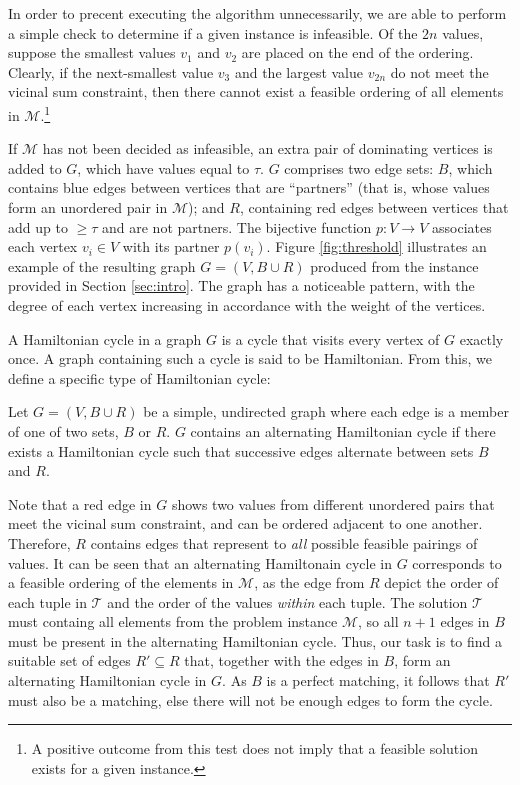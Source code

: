\documentclass{elsarticle}
\begin{document}
In order to precent executing the algorithm unnecessarily, we are able to perform a simple check to determine if a given instance is infeasible. Of the $2n$ values, suppose the smallest values $v_1$ and $v_2$ are placed on the end of the ordering. Clearly, if the next-smallest value $v_3$ and the largest value $v_{2n}$ do not meet the vicinal sum constraint, then there cannot exist a feasible ordering of all elements in $\mathcal{M}$.\footnote{A positive outcome from this test does not imply that a feasible solution exists for a given instance.}

If $\mathcal{M}$ has not been decided as infeasible, an extra pair of dominating vertices is added to $G$, which have values equal to $\tau$. $G$ comprises two edge sets: $B$, which contains blue edges between vertices that are ``partners'' (that is, whose values form an unordered pair in $\mathcal{M}$); and $R$, containing red edges between vertices that add up to $\geq \tau$ and are not partners. The bijective function $p : V \to V$ associates each vertex $v_i \in V$ with its partner $p(v_i)$. Figure \ref{fig:threshold} illustrates an example of the resulting graph $G = (V, B \cup R)$ produced from the instance provided in Section \ref{sec:intro}. The graph has a noticeable pattern, with the degree of each vertex increasing in accordance with the weight of the vertices.

A Hamiltonian cycle in a graph $G$ is a cycle that visits every vertex of $G$ exactly once. A graph containing such a cycle is said to be Hamiltonian. From this, we define a specific type of Hamiltonian cycle:

\begin{definition}
	\label{defn:althamcycle}
	Let $G = (V, B \cup R)$ be a simple, undirected graph where each edge is a member of one of two sets, $B$ or $R$. $G$ contains an alternating Hamiltonian cycle if there exists a Hamiltonian cycle such that successive edges alternate between sets $B$ and $R$.
\end{definition}

Note that a red edge in $G$ shows two values from different unordered pairs that meet the vicinal sum constraint, and can be ordered adjacent to one another. Therefore, $R$ contains edges that represent to \emph{all} possible feasible pairings of values. It can be seen that an alternating Hamiltonain cycle in $G$ corresponds to a feasible ordering of the elements in $\mathcal{M}$, as the edge from $R$ depict the order of each tuple in $\mathcal{T}$ and the order of the values \emph{within} each tuple. The solution $\mathcal{T}$ must containg all elements from the problem instance $\mathcal{M}$, so all $n+1$ edges in $B$ must be present in the alternating Hamiltonian cycle. Thus, our task is to find a suitable set of edges $R' \subseteq R$ that, together with the edges in $B$, form an alternating Hamiltonian cycle in $G$. As $B$ is a perfect matching, it follows that $R'$ must also be a matching, else there will not be enough edges to form the cycle.
\end{document}
